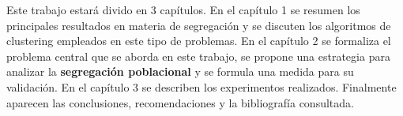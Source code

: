 Este trabajo estará divido en 3 capítulos. En el capítulo 1 se resumen los principales resultados en materia de segregación y se discuten los algoritmos de clustering empleados en este tipo de problemas. En el capítulo 2 se formaliza el problema central que se aborda en este trabajo, se propone una estrategia para analizar la \textbf{segregación poblacional} y se formula una medida para su validación. En el capítulo 3 se describen los experimentos realizados. Finalmente aparecen las conclusiones, recomendaciones y la bibliografía consultada.



